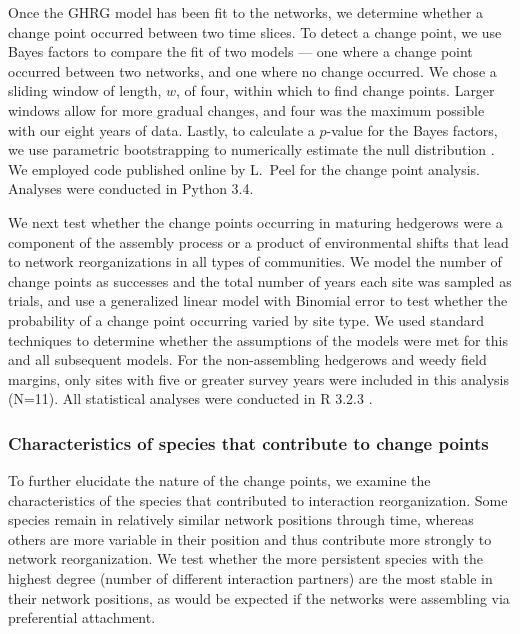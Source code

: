 \documentclass[12pt]{article}
\begin{document}
Once the GHRG model has been fit to the networks, we determine whether
a change point occurred between two time slices. To detect a change
point, we use Bayes factors to compare the fit of two models --- one
where a change point occurred between two networks, and one where no
change occurred. We chose a sliding window of length, $w$, of four,
within which to find change points. Larger windows allow for more
gradual changes, and four was the maximum possible with our eight
years of data. Lastly, to calculate a $p$-value for the Bayes factors,
we use parametric bootstrapping to numerically estimate the null
distribution \citep{peel2014detecting}. We employed code published
online by L.~Peel for the change point analysis. Analyses were
conducted in Python 3.4.

We next test whether the change points occurring in maturing hedgerows
were a component of the assembly process or a product of environmental
shifts that lead to network reorganizations in all types of
communities. We model the number of change points as successes and the
total number of years each site was sampled as trials, and use a
generalized linear model with Binomial error to test whether the
probability of a change point occurring varied by site type. We used
standard techniques to determine whether the assumptions of the models
were met for this and all subsequent models. For the non-assembling
hedgerows and weedy field margins, only sites with five or greater
survey years were included in this analysis (N=11). All statistical
analyses were conducted in R 3.2.3 \citep{R}.

\subsubsection*{Characteristics of species that contribute to change
  points}

To further elucidate the nature of the change points, we examine the
characteristics of the species that contributed to interaction
reorganization. Some species remain in relatively similar network
positions through time, whereas others are more variable in their
position and thus contribute more strongly to network
reorganization. We test whether the more persistent species with the
highest degree (number of different interaction partners) are the
most stable in their network positions, as would be expected if the
networks were assembling via preferential attachment.
\end{document}
